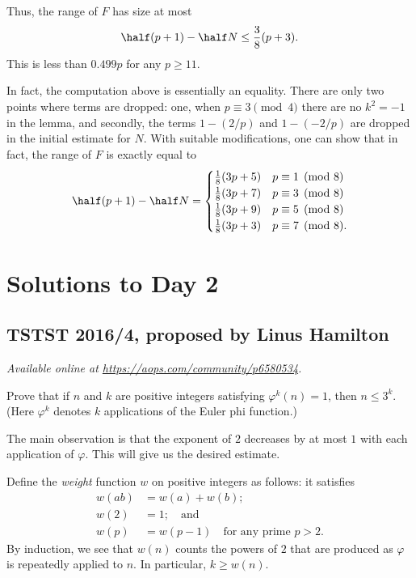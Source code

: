\documentclass[11pt]{scrartcl}
\begin{document}
Thus, the range of $F$ has size at most
\[ \half(p+1) - \half N \le \frac38(p+3). \]
This is less than $0.499p$ for any $p \ge 11$.

\begin{remark*}
  In fact, the computation above is essentially an equality.
  There are only two points where terms are dropped:
  one, when $p \equiv 3 \pmod 4$ there are no $k^2 = -1$ in the lemma,
  and secondly, the terms $1-\left( 2/p \right)$ and $1-\left( -2/p \right)$
  are dropped in the initial estimate for $N$.
  With suitable modifications, one can show that in fact,
  the range of $F$ is exactly equal to
  \[
    \half(p+1) - \half N =
    \begin{cases}
      \frac18(3p+5) & p \equiv 1 \pmod 8 \\
      \frac18(3p+7) & p \equiv 3 \pmod 8 \\
      \frac18(3p+9) & p \equiv 5 \pmod 8 \\
      \frac18(3p+3) & p \equiv 7 \pmod 8.
    \end{cases}
  \]
\end{remark*}
\pagebreak

\section{Solutions to Day 2}
\subsection{TSTST 2016/4, proposed by Linus Hamilton}
\textsl{Available online at \url{https://aops.com/community/p6580534}.}
\begin{mdframed}[style=mdpurplebox,frametitle={Problem statement}]
Prove that if $n$ and $k$ are positive integers
satisfying $\varphi^k(n) = 1$, then $n \le 3^k$.
(Here $\varphi^k$ denotes $k$ applications of the Euler phi function.)
\end{mdframed}
The main observation is that the exponent of $2$ decreases
by at most $1$ with each application of $\varphi$.
This will give us the desired estimate.

Define the \emph{weight} function $w$ on positive integers as follows:
it satisfies
\begin{align*}
  w(ab) &= w(a)+w(b); \\
  w(2) &= 1; \quad\text{and} \\
  w(p) &= w(p-1) \quad \text{for any prime $p > 2$}.
\end{align*}
By induction, we see that $w(n)$ counts the powers of $2$
that are produced as $\varphi$ is repeatedly applied to $n$.
In particular, $k \ge w(n)$.
\end{document}
